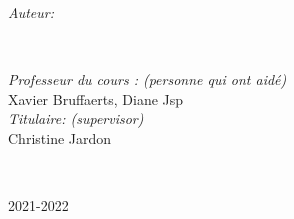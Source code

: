 \begin{titlepage}
    \begin{minipage}{0.4\textwidth}
    \begin{flushleft} \large
    \emph{Auteur:}\\
    \@author %
    \end{flushleft}
    \end{minipage}
    ~
    \begin{minipage}{0.4\textwidth}
    \begin{flushright} \large
    \emph{Professeur du cours : (personne qui ont aidé)} \\
    Xavier Bruffaerts, Diane Jsp \\[1.2em] %
    \emph{Titulaire: (supervisor)} \\
    Christine Jardon %
    \end{flushright}
    \end{minipage}\\[2cm]
    \makeatother
    
    
    
    {\large 2021-2022}\\[2cm] %
    
    \vfill %
    
    \end{titlepage}
